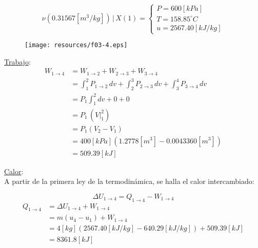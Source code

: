 \documentclass[letter,11pt]{article}
\begin{document}
\begin{enumerate}
\begin{equation*}
    \nu(0.31567[m^3/kg])\,|\,X(1) = \begin{cases}
        P = 600[kPa] \\
        T = 158.85^\circ C \\
        u = 2567.40[kJ/kg]
    \end{cases}
\end{equation*}

\begin{figure}[H]
\centering
\texttt{[image: resources/f03-4.eps]}
\end{figure}

\underline{Trabajo}: \\
\begin{equation*}
    \begin{split}
    W_{1\rightarrow 4} &= W_{1\rightarrow 2} + W_{2\rightarrow 3}
                          + W_{3\rightarrow 4} \\
                       &= \int_1^2 P_{1\rightarrow 2}\,dv
                          + \int_2^3 P_{2\rightarrow 3}\,dv
                          + \int_3^4 P_{3\rightarrow 4}\,dv \\
                       &= P_1 \int_1^2 dv + 0 + 0 \\
                       &= P_1\,(V\Biggr|_1^2) \\
                       &= P_1(V_2-V_1) \\
                       &= 400[kPa](1.2778[m^3]-0.0043360[m^3]) \\
                       &= 509.39[kJ]
    \end{split}
\end{equation*}

\underline{Calor}: \\
A partir de la primera ley de la termodinámica, se halla el calor intercambiado:

\begin{equation*}
    \Delta U_{1\rightarrow 4} = Q_{1\rightarrow 4} - W_{1\rightarrow 4}
\end{equation*}
\begin{equation*}
    \begin{split}
        Q_{1\rightarrow 4} &= \Delta U_{1\rightarrow 4} + W_{1\rightarrow 4} \\
                           &= m(u_4 - u_1) + W_{1\rightarrow 4} \\
                           &= 4[kg](2567.40[kJ/kg]
                              -640.29[kJ/kg])+509.39[kJ] \\
                           &= 8361.8[kJ]
    \end{split}
\end{equation*}


\end{enumerate}
\end{document}
